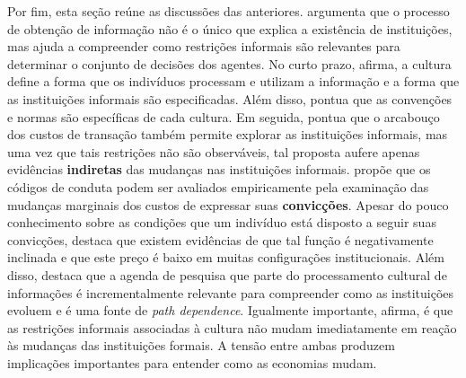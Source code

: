 Por fim, esta seção reúne as discussões das anteriores. \autor argumenta que o processo de obtenção de informação não é o único que explica a existência de instituições, mas ajuda a compreender como restrições informais são relevantes para determinar o conjunto de decisões dos agentes. No curto prazo, afirma, a cultura define a forma que os indivíduos processam e utilizam a informação e a forma que as instituições informais são especificadas. Além disso, pontua que as convenções e normas são específicas de cada cultura. Em seguida, pontua que o arcabouço dos custos de transação também permite explorar as instituições informais, mas uma vez que tais restrições não são observáveis, tal proposta aufere apenas evidências \textbf{indiretas} das mudanças nas instituições informais. \autor propõe que os códigos de conduta podem ser avaliados empiricamente pela examinação das mudanças marginais dos custos de expressar suas \textbf{convicções}. Apesar do pouco conhecimento sobre as condições que um indivíduo está disposto a seguir suas convicções, destaca que existem evidências de que tal função é negativamente inclinada e que este preço é baixo em muitas configurações institucionais. Além disso, destaca que a agenda de pesquisa que parte do processamento cultural de informações é incrementalmente relevante para compreender como as instituições evoluem e é uma fonte de \textit{path dependence}. Igualmente importante, afirma, é que as restrições informais associadas à cultura não mudam imediatamente em reação às mudanças das instituições formais. A tensão entre ambas produzem implicações importantes para entender como as economias mudam.